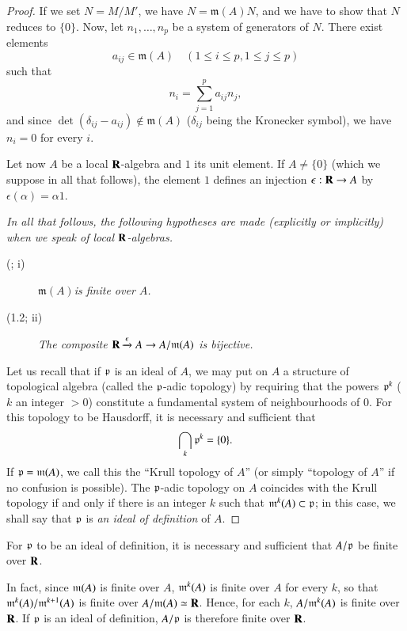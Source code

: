 \begin{proof}
If we set $N=M/M'$, we have $N=\mathfrak{m}(A)N$, and we have to show that $N$ reduces to $\{0\}$. Now, let $n_{1},\ldots,n_{p}$ be a system of generators of $N$. There exist elements
$$
a_{ij}\in \mathfrak{m}(A)\quad (1\leq i\leq p, 1\leq j\leq p)
$$
such that
$$
n_{i}=\sum\limits^{p}_{j=1}a_{ij}n_{j},
$$
and since $\det (\delta_{ij}-a_{ij})\not\in \mathfrak{m}(A)$ ($\delta_{ij}$ being the Kronecker symbol), we have $n_{i}=0$ for every $i$.

Let now $A$ be a local $\mathbf{R}$-algebra and $1$ its unit element. If $A\neq \{0\}$ (which we suppose in all that follows), the element $1$ defines an injection $\epsilon:\mathbf{R}\to A$ by $\epsilon(\alpha)=\alpha 1$.

{\em In all that follows, the following hypotheses are made (explicitly or implicitly) when we speak of local $\mathbf{R}$-algebras.}
\begin{description}
\item[(;\label{chap3-id1.2} i)] {\em $\mathfrak{m}(A)$\pageoriginale is finite over $A$.}

\item[(1.2; ii)] {\em The composite $\mathbf{R}\xrightarrow{\epsilon}A\to A/\mathfrak{m}(A)$ is bijective.}
\end{description}

Let us recall that if $\mathfrak{p}$ is an ideal of $A$, we may put on $A$ a structure of topological algebra (called the $\mathfrak{p}$-adic topology) by requiring that the powers $\mathfrak{p}^{k}$ ($k$ an integer $>0$) constitute a fundamental system of neighbourhoods of $0$. For this topology to be Hausdorff, it is necessary and sufficient that
$$
\bigcap\limits_{k}\mathfrak{p}^{k}=\{0\}.
$$
If $\mathfrak{p}=\mathfrak{m}(A)$, we call this the ``Krull topology of $A$'' (or simply ``topology of $A$'' if no confusion is possible). The $\mathfrak{p}$-adic topology on $A$ coincides with the Krull topology if and only if there is an integer $k$ such that $\mathfrak{m}^{k}(A)\subset \mathfrak{p}$; in this case, we shall say that $\mathfrak{p}$ is {\em an ideal of definition} of $A$.
\end{proof}

\setcounter{theorem}{2}
\begin{proposition}\label{chap3-prop1.3}
For $\mathfrak{p}$ to be an ideal of definition, it is necessary and sufficient that $A/\mathfrak{p}$ be finite over $\mathbf{R}$.
\end{proposition}

In fact, since $\mathfrak{m}(A)$ is finite over $A$, $\mathfrak{m}^{k}(A)$ is finite over $A$ for every $k$, so that $\mathfrak{m}^{k}(A)/\mathfrak{m}^{k+1}(A)$ is finite over $A/\mathfrak{m}(A)\simeq \mathbf{R}$. Hence, for each $k$, $A/\mathfrak{m}^{k}(A)$ is finite over $\mathbf{R}$. If $\mathfrak{p}$ is an ideal of definition, $A/\mathfrak{p}$ is therefore finite over $\mathbf{R}$.

